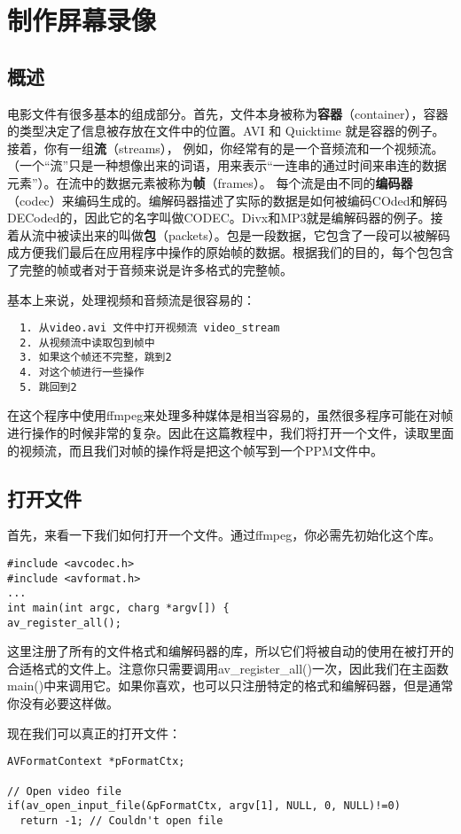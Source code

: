 ﻿\chapter{制作屏幕录像}
\label{ch1}
\section{概述}
电影文件有很多基本的组成部分。首先，文件本身被称为\textbf{容器}（container），容器的类型决定了信息被存放在文件中的位置。AVI 和 Quicktime 就是容器的例子。接着，你有一组\textbf{流}（streams）， 例如，你经常有的是一个音频流和一个视频流。（一个“流”只是一种想像出来的词语，用来表示“一连串的通过时间来串连的数据元素”）。在流中的数据元素被称为\textbf{帧}（frames）。 每个流是由不同的\textbf{编码器}（codec）来编码生成的。编解码器描述了实际的数据是如何被编码COded和解码DECoded的，因此它的名字叫做CODEC。Divx和MP3就是编解码器的例子。接着从流中被读出来的叫做\textbf{包}（packets）。包是一段数据，它包含了一段可以被解码成方便我们最后在应用程序中操作的原始帧的数据。根据我们的目的，每个包包含了完整的帧或者对于音频来说是许多格式的完整帧。

基本上来说，处理视频和音频流是很容易的：

\begin{verbatim}
  1. 从video.avi 文件中打开视频流 video_stream
  2. 从视频流中读取包到帧中
  3. 如果这个帧还不完整，跳到2
  4. 对这个帧进行一些操作
  5. 跳回到2
\end{verbatim}


在这个程序中使用ffmpeg来处理多种媒体是相当容易的，虽然很多程序可能在对帧进行操作的时候非常的复杂。因此在这篇教程中，我们将打开一个文件，读取里面的视频流，而且我们对帧的操作将是把这个帧写到一个PPM文件中。

\section{打开文件}

首先，来看一下我们如何打开一个文件。通过ffmpeg，你必需先初始化这个库。
\begin{lstlisting}
#include <avcodec.h>
#include <avformat.h>
...
int main(int argc, charg *argv[]) {
av_register_all();
\end{lstlisting}


这里注册了所有的文件格式和编解码器的库，所以它们将被自动的使用在被打开的合适格式的文件上。注意你只需要调用av_register_all()一次，因此我们在主函数main()中来调用它。如果你喜欢，也可以只注册特定的格式和编解码器，但是通常你没有必要这样做。

现在我们可以真正的打开文件：
\begin{lstlisting}
AVFormatContext *pFormatCtx;

// Open video file
if(av_open_input_file(&pFormatCtx, argv[1], NULL, 0, NULL)!=0)
  return -1; // Couldn't open file
\end{lstlisting}

